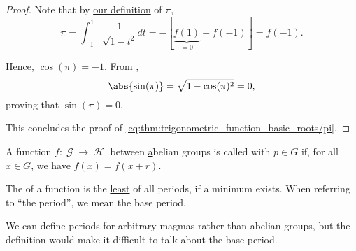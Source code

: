 \begin{proof}
  Note that by \hyperref[def:pi]{our definition} of \( \pi \),
  \begin{equation*}
    \pi
    =
    \int_{-1}^1 \frac 1 {\sqrt{1 - t^2}} dt
    =
    -[\underbrace{f(1)}_{=0} - f(-1)]
    =
    f(-1).
  \end{equation*}

  Hence, \( \cos(\pi) = -1 \). From ,
  \begin{equation*}
    \abs{\sin(\pi)} = \sqrt{1 - \cos(\pi)^2} = 0,
  \end{equation*}
  proving that \( \sin(\pi) = 0 \).

  This concludes the proof of \eqref{eq:thm:trigonometric_function_basic_roots/pi}.
\end{proof}

\begin{definition}\label{def:periodic_function}
  A function \( f: \mscrG \to \mscrH \) between \hyperref[def:abelian_group] abelian groups is called  with  \( p \in G \) if, for all \( x \in G \), we have \( f(x) = f(x + r) \).

  The  of a function is the \hyperref[def:partially_ordered_set_extremal_points/maximum_and_minimum]{least} of all periods, if a minimum exists. When referring to \enquote{the period}, we mean the base period.

  We can define periods for arbitrary magmas rather than abelian groups, but the definition would make it difficult to talk about the base period.
\end{definition}

